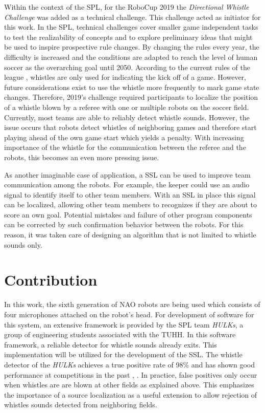 Within the context of the \ac{SPL}, for the \ac{RoboCup} 2019 the \textit{Directional
Whistle Challenge} was added as a technical challenge. This challenge acted as
initiator for this work. In the \ac{SPL}, technical challenges cover smaller
game independent tasks to test the realizability of concepts and to explore
preliminary ideas that might be used to inspire prospective rule changes. By
changing the rules every year, the difficulty is increased and the conditions
are adapted to reach the level of human soccer as the overarching goal until
2050. According to the current rules of the league \cite{rules},
whistles are only used for indicating the kick off of a game. However,
future considerations exist to use the whistle more frequently to mark
game state changes. Therefore, 2019's challenge required participants to
localize the position of a whistle blown by a referee with one or
multiple robots on the soccer field.
Currently, most teams are able to reliably detect whistle sounds. However, the
issue occurs that robots detect whistles of neighboring games and therefore
start playing ahead of the own game start which yields a penalty. With
increasing importance of the whistle for the communication between the referee
and the robots, this becomes an even more pressing issue.

As another imaginable case of application, a \ac{SSL} can be used to improve team
communication among the robots.
For example, the keeper could use an audio signal to identify itself to other team
members. With an \ac{SSL} in place this signal can be localized, allowing other
team members to recognizes if they are about to score an own goal.
Potential mistakes and failure of other program components can be corrected by such
confirmation behavior between the robots.
For this reason, it was taken care of designing an algorithm that is not
limited to whistle sounds only.

\section{Contribution}
\label{sec:01_contribution}

In this work, the sixth generation of NAO robots are being used
which consists of four microphones attached on the robot's head.
For development of software for this system, an extensive framework is provided by
the \ac{SPL} team \textit{HULKs}, a group of engineering students associated
with the \ac{TUHH}.
In this software framework, a reliable detector for whistle sounds already exits.
This implementation will be utilized for the development of the \ac{SSL}. The
whistle detector of the \textit{HULKs} achieves a true positive rate of 98\si{\percent}
and has shown good performance at competitions in the past \cite{Hasselbring}, \cite{statistics}.
In practice, false positives only occur when whistles are are blown
at other fields as explained above. This emphasizes the importance of
a source localization as a useful extension to allow rejection of whistles
sounds detected from neighboring fields.

